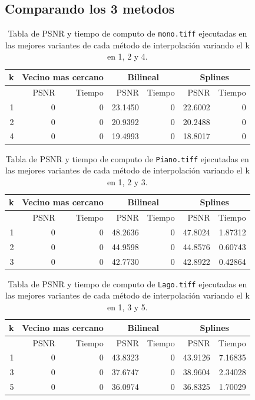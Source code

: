 \documentclass[a4paper]{article}
\newcounter{col}
\begin{document}
\subsection{Comparando los 3 metodos}

\begin{table}[H]
\centering
\begin{tabular}{|r|r|r|r|r|r|r|}
\hline
\multicolumn{1}{|c|}{k} & \multicolumn{2}{|c|}{Vecino mas cercano} & \multicolumn{2}{|c|}{Bilineal} & \multicolumn{2}{|c|}{Splines} \\ \hline
  & PSNR & Tiempo & PSNR & Tiempo & PSNR & Tiempo \\ \hline
1 & 0 & 0 & 23.1450 & 0 &  22.6002 & 0 \\ \hline
2 & 0 & 0 & 20.9392 & 0 &  20.2488 & 0 \\ \hline
4 & 0 & 0 & 19.4993 & 0 &  18.8017 & 0 \\ \hline
\end{tabular}
\caption{Tabla de PSNR y tiempo de computo de \texttt{mono.tiff} ejecutadas en las mejores variantes de cada m\'etodo de interpolaci\'on variando el k en 1, 2 y 4.}
\label{}
\end{table}


\begin{table}[H]
\centering
\begin{tabular}{|r|r|r|r|r|r|r|}
\hline
\multicolumn{1}{|c|}{k} & \multicolumn{2}{|c|}{Vecino mas cercano} & \multicolumn{2}{|c|}{Bilineal} & \multicolumn{2}{|c|}{Splines} \\ \hline
  & PSNR & Tiempo & PSNR & Tiempo & PSNR & Tiempo \\ \hline
1 & 0 & 0 & 48.2636 & 0 &  47.8024 & 1.87312 \\ \hline
2 & 0 & 0 & 44.9598 & 0 &  44.8576 & 0.60743 \\ \hline
3 & 0 & 0 & 42.7730 & 0 &  42.8922 & 0.42864 \\ \hline
\end{tabular}
\caption{Tabla de PSNR y tiempo de computo de \texttt{Piano.tiff} ejecutadas en las mejores variantes de cada m\'etodo de interpolaci\'on variando el k en 1, 2 y 3.}
\label{}
\end{table}


\begin{table}[H]
\centering
\begin{tabular}{|r|r|r|r|r|r|r|}
\hline
\multicolumn{1}{|c|}{k} & \multicolumn{2}{|c|}{Vecino mas cercano} & \multicolumn{2}{|c|}{Bilineal} & \multicolumn{2}{|c|}{Splines} \\ \hline
  & PSNR & Tiempo & PSNR & Tiempo & PSNR & Tiempo \\ \hline
1 & 0 & 0 & 43.8323 & 0 &  43.9126 & 7.16835 \\ \hline
3 & 0 & 0 & 37.6747 & 0 &  38.9604 & 2.34028 \\ \hline
5 & 0 & 0 & 36.0974 & 0 &  36.8325 & 1.70029 \\ \hline
\end{tabular}
\caption{Tabla de PSNR y tiempo de computo de \texttt{Lago.tiff} ejecutadas en las mejores variantes de cada m\'etodo de interpolaci\'on variando el k en 1, 3 y 5.}
\label{}
\end{table}
\end{document}
